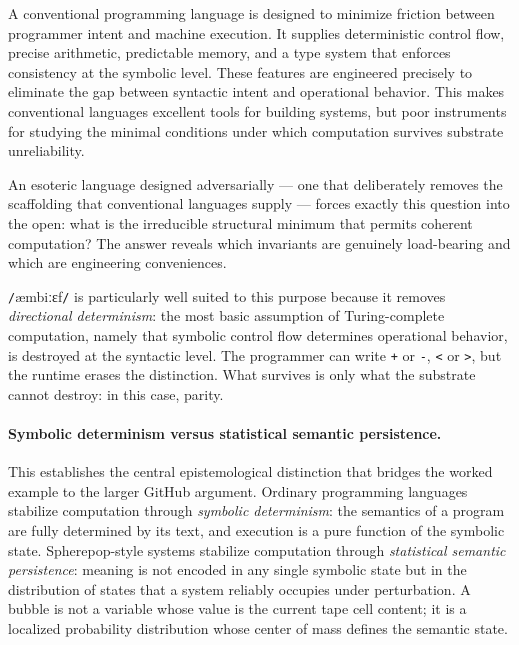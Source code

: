 \documentclass[11pt]{article}
\newcommand{\ambibf}{%
  \texttt{/}\textnormal{æmbiːɛf}\texttt{/}%
}
\begin{document}
A conventional programming language is designed to minimize friction between
programmer intent and machine execution. It supplies deterministic control flow,
precise arithmetic, predictable memory, and a type system that enforces
consistency at the symbolic level. These features are engineered precisely to
eliminate the gap between syntactic intent and operational behavior. This makes
conventional languages excellent tools for building systems, but poor
instruments for studying the minimal conditions under which computation
survives substrate unreliability.

An esoteric language designed adversarially --- one that deliberately removes
the scaffolding that conventional languages supply --- forces exactly this
question into the open: what is the irreducible structural minimum that permits
coherent computation? The answer reveals which invariants are genuinely load-bearing
and which are engineering conveniences.

\ambibf{} is particularly well suited to this purpose because it removes
\emph{directional determinism}: the most basic assumption of Turing-complete
computation, namely that symbolic control flow determines operational behavior,
is destroyed at the syntactic level. The programmer can write \texttt{+} or
\texttt{-}, \texttt{<} or \texttt{>}, but the runtime erases the distinction.
What survives is only what the substrate cannot destroy: in this case, parity.

\paragraph{Symbolic determinism versus statistical semantic persistence.}
This establishes the central epistemological distinction that bridges the
worked example to the larger GitHub argument. Ordinary programming languages
stabilize computation through \emph{symbolic determinism}: the semantics of
a program are fully determined by its text, and execution is a pure function
of the symbolic state. Spherepop-style systems stabilize computation through
\emph{statistical semantic persistence}: meaning is not encoded in any single
symbolic state but in the distribution of states that a system reliably
occupies under perturbation. A bubble is not a variable whose value is the
current tape cell content; it is a localized probability distribution whose
center of mass defines the semantic state.
\end{document}
